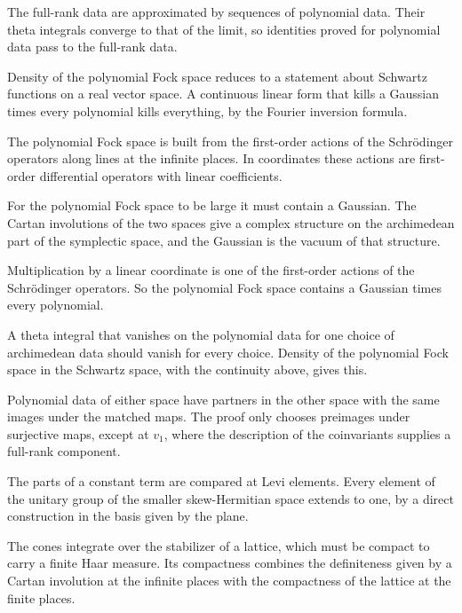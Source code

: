 The full-rank data are approximated by sequences of polynomial data. Their
theta integrals converge to that of the limit, so identities proved for
polynomial data pass to the full-rank data.

Density of the polynomial Fock space reduces to a statement about Schwartz
functions on a real vector space. A continuous linear form that kills a
Gaussian times every polynomial kills everything, by the Fourier inversion
formula.

The polynomial Fock space is built from the first-order actions of the
Schrödinger operators along lines at the infinite places. In coordinates these
actions are first-order differential operators with linear coefficients.

For the polynomial Fock space to be large it must contain a Gaussian. The
Cartan involutions of the two spaces give a complex structure on the
archimedean part of the symplectic space, and the Gaussian is the vacuum of
that structure.

Multiplication by a linear coordinate is one of the first-order actions of the
Schrödinger operators. So the polynomial Fock space contains a Gaussian times
every polynomial.

A theta integral that vanishes on the polynomial data for one choice of
archimedean data should vanish for every choice. Density of the polynomial
Fock space in the Schwartz space, with the continuity above, gives this.

Polynomial data of either space have partners in the other space with the
same images under the matched maps. The proof only chooses preimages under
surjective maps, except at $v_1$, where the description of the coinvariants
supplies a full-rank component.

The parts of a constant term are compared at Levi elements. Every element of
the unitary group of the smaller skew-Hermitian space extends to one, by a
direct construction in the basis given by the plane.

The cones integrate over the stabilizer of a lattice, which must be compact to
carry a finite Haar measure. Its compactness combines the definiteness given
by a Cartan involution at the infinite places with the compactness of the
lattice at the finite places.

